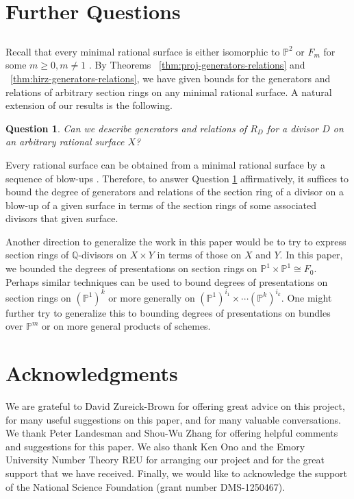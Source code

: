 \documentclass{amsart}
\theoremstyle{plain}
\newtheorem{question}[thm]{Question}
\theoremstyle{definition}
\theoremstyle{remark}
\numberwithin{equation}{subsection}
\newcommand\bq{{\mathbb Q}}
\newcommand\bp{{\mathbb P}}
\newcommand\hirz{F}
\begin{document}

\section{Further Questions}
\label{sec:conc}
\subsection{}
Recall that every minimal rational surface is either isomorphic to
$\bp^2$ or $\hirz_m$ for some $m \geq 0, m \neq 1$ \cite{eisenbud-harris:minimal}. By Theorems
~\ref{thm:proj-generators-relations} and ~\ref{thm:hirz-generators-relations}, we have given bounds for the generators and relations
of arbitrary section rings on any minimal rational surface. A
natural extension of our results is the following.
\begin{question}
\label{qn:general-minimal-surface}
Can we describe generators and relations of $R_D$ for a divisor $D$ on an
arbitrary rational surface $X$?
\end{question}

Every rational surface can be obtained from a minimal rational surface by a 
sequence of blow-ups \cite{eisenbud-harris:minimal}. Therefore, to answer
Question \ref{qn:general-minimal-surface} affirmatively, it suffices
to bound the degree of generators and relations of the 
section ring of a divisor on a blow-up of a given surface
in terms of the section 
rings of some associated divisors that given surface.

Another direction to generalize the work in this paper
would be to try to express section rings of $\bq$-divisors on
$X \times Y$ in terms of those on $X$ and $Y$. In this paper,
we bounded the degrees of presentations on section rings on $\bp^1 \times \bp^1 \cong \hirz_0$.
Perhaps similar techniques can be used to bound
degrees of presentations on section rings on $(\bp^1)^k$ or
more generally on $(\bp^1)^{i_1} \times \cdots (\bp^k)^{i_k}.$
One might further try to generalize this to bounding degrees of presentations on bundles over $\bp^m$ or on more general
products of schemes.


\section{Acknowledgments}
\label{sec:ack}
We are grateful to David Zureick-Brown for offering great advice on
this project, for many useful suggestions on this paper, and for
many valuable conversations. We thank Peter
Landesman and Shou-Wu Zhang for offering helpful comments and
suggestions for this paper. We also thank Ken Ono and the
Emory University Number Theory REU for arranging our project and
for the great support that we have received. Finally, we would like to acknowledge the
support of the National Science Foundation (grant number DMS-1250467).


\nocite{*}


\end{document}
